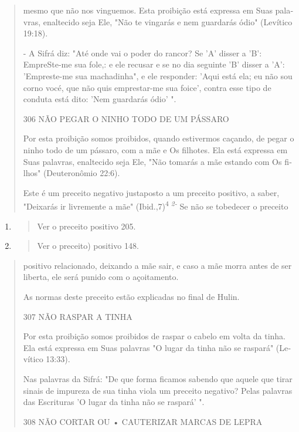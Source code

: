 \begin{quote}
mesmo que não nos vinguemos. Esta proibição está expressa em Suas
pala­vras, enaltecido seja Ele, "Não te vingarás e nem guardarás ódio"
(Levítico 19:18).

- A Sifrá diz: "Até onde vai o poder do rancor? Se 'A' disser a 'B':
EmpreSte-me sua fole,: e ele recusar e se no dia seguinte 'B' disser a
'A': 'Em­preste-me sua machadinha", e ele responder: 'Aqui está ela; eu
não sou corno vocé, que não quis emprestar-me sua foice', contra esse
tipo de conduta está di­to: 'Nem guardarás ódio' ".

306 NÃO PEGAR O NINHO TODO DE UM PÁSSARO

Por esta proibição somos proibidos, quando estivermos caçando, de pegar
o ninho todo de um pássaro, com a mãe e Os filhotes. Ela está expressa
em Suas palavras, enaltecido seja Ele, "Não tomarás a mãe estando com Os
fi­lhos" (Deuteronômio 22:6).

Este é um preceito negativo justaposto a um preceito positivo, a sa­ber,
"Deixarás ir livremente a mãe" (Ibid.,7)\textsuperscript{4 \emph{2-}} Se
não se tobedecer o preceito
\end{quote}

\begin{enumerate}
\def\labelenumi{\arabic{enumi}.}
\setcounter{enumi}{425}
\item
  \begin{quote}
  Ver o preceito positivo 205.
  \end{quote}
\item
  \begin{quote}
  Ver o preceito) positivo 148.
  \end{quote}
\end{enumerate}

\begin{quote}
positivo relacionado, deixando a mãe sair, e caso a mãe morra antes de
ser li­berta, ele será punido com o açoitamento.

As normas deste preceito estão explicadas no final de Hulin.

307 NÃO RASPAR A TINHA

Por esta proibição somos proibidos de raspar o cabelo em volta da tinha.
Ela está expressa em Suas palavras "O lugar da tinha não se raspará"
(Le­vítico 13:33).

Nas palavras da Sifrá: "De que forma ficamos sabendo que aquele que
tirar sinais de impureza de sua tinha viola um preceito negativo? Pelas
pala­vras das Escrituras 'O lugar da tinha não se raspará' ".

308 NÃO CORTAR OU • CAUTERIZAR MARCAS DE LEPRA
\end{quote}

